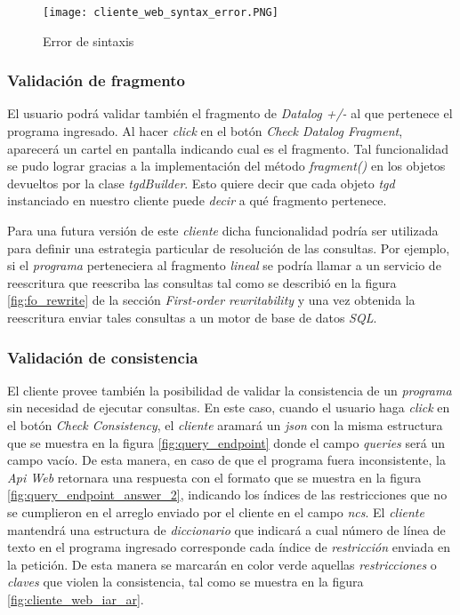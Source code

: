 \documentclass[11pt,a4paper,twoside]{tesis}
\begin{document}
\begin{figure}[ht]
    \texttt{[image: cliente\_web\_syntax\_error.PNG]}
    \centering
    \caption{Error de sintaxis}
    \label{fig:cliente_web_syntax_error}
\end{figure}

\subsubsection{Validación de fragmento}
El usuario podrá validar también el fragmento de \textit{Datalog +/-} al que pertenece el programa ingresado. Al hacer \textit{click} en el botón \textit{Check Datalog Fragment}, aparecerá un cartel en pantalla indicando cual es el fragmento. Tal funcionalidad se pudo lograr gracias a la implementación del método \textit{fragment()} en los objetos devueltos por la clase \textit{tgdBuilder}. Esto quiere decir que cada objeto \textit{tgd} instanciado en nuestro cliente puede \textit{decir} a qué fragmento pertenece.

Para una futura versión de este \textit{cliente} dicha funcionalidad podría ser utilizada para definir una estrategia particular de resolución de las consultas. Por ejemplo, si el \textit{programa} perteneciera al fragmento \textit{lineal} se podría llamar a un servicio de reescritura que reescriba las consultas tal como se describió en la figura \ref{fig:fo_rewrite} de la sección \textit{First-order rewritability} y una vez obtenida la reescritura enviar tales consultas a un motor de base de datos \textit{SQL}.

\subsubsection{Validación de consistencia}

El cliente provee también la posibilidad de validar la consistencia de un \textit{programa} sin necesidad de ejecutar consultas. En este caso, cuando el usuario haga \textit{click} en el botón \textit{Check Consistency}, el \textit{cliente} aramará un \textit{json} con la misma estructura que se muestra en la figura \ref{fig:query_endpoint} donde el campo \textit{queries} será un campo vacío. De esta manera, en caso de que el programa fuera inconsistente, la \textit{Api Web} retornara una respuesta con el formato que se muestra en la figura \ref{fig:query_endpoint_answer_2}, indicando los índices de las restricciones que no se cumplieron en el arreglo enviado por el cliente en el campo \textit{ncs}. El \textit{cliente} mantendrá una estructura de \textit{diccionario} que indicará a cual número de línea de texto en el programa ingresado corresponde cada índice de \textit{restricción} enviada en la petición. De esta manera se marcarán en color verde aquellas \textit{restricciones} o \textit{claves} que violen la consistencia, tal como se muestra en la figura  \ref{fig:cliente_web_iar_ar}.
\end{document}
